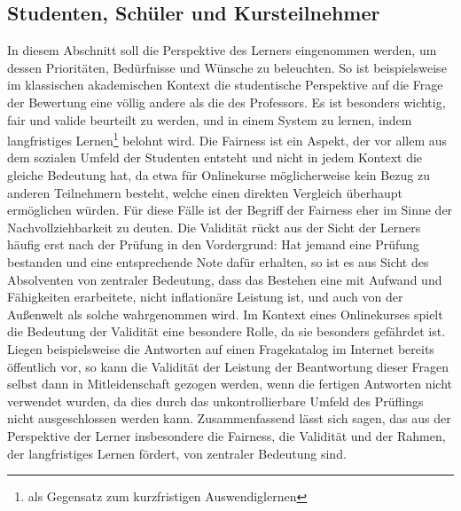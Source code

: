 \subsection{Studenten, Schüler und Kursteilnehmer}
In diesem Abschnitt soll die Perspektive des Lerners eingenommen werden, um dessen Prioritäten, Bedürfnisse und Wünsche zu beleuchten. So ist beispielsweise im klassischen akademischen Kontext die studentische Perspektive auf die Frage der Bewertung eine völlig andere als die des Professors. Es ist besonders wichtig, fair und valide beurteilt zu werden, und in einem System zu lernen, indem langfristiges Lernen\footnote{als Gegensatz zum kurzfristigen Auswendiglernen} belohnt wird. Die Fairness ist ein Aspekt, der vor allem aus dem sozialen Umfeld der Studenten entsteht und nicht in jedem Kontext die gleiche Bedeutung hat, da etwa für Onlinekurse möglicherweise kein Bezug zu anderen Teilnehmern besteht, welche einen direkten Vergleich überhaupt ermöglichen würden. Für diese Fälle ist der Begriff der Fairness eher im Sinne der Nachvollziehbarkeit zu deuten. Die Validität rückt aus der Sicht der Lerners häufig erst nach der Prüfung in den Vordergrund: Hat jemand eine Prüfung bestanden und eine entsprechende Note dafür erhalten, so ist es aus Sicht des Absolventen von zentraler Bedeutung, dass das Bestehen eine mit Aufwand und Fähigkeiten erarbeitete, nicht inflationäre Leistung ist, und auch von der Außenwelt als solche wahrgenommen wird. Im Kontext eines Onlinekurses spielt die Bedeutung der Validität eine besondere Rolle, da sie besonders gefährdet ist. Liegen beispielsweise die Antworten auf einen Fragekatalog im Internet bereits öffentlich vor, so kann die Validität der Leistung der Beantwortung dieser Fragen selbst dann in Mitleidenschaft gezogen werden, wenn die fertigen Antworten nicht verwendet wurden, da dies durch das unkontrollierbare Umfeld des Prüflings nicht ausgeschlossen werden kann. Zusammenfassend lässt sich sagen, das aus der Perspektive der Lerner insbesondere die Fairness, die Validität und der Rahmen, der langfristiges Lernen fördert, von zentraler Bedeutung sind.

